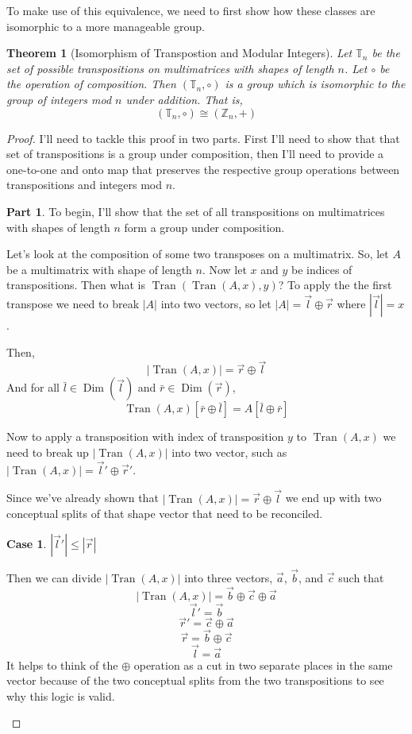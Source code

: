 \documentclass[12pt]{book}
\theoremstyle{plain}
\newtheorem{theorem}{Theorem}[chapter]
\theoremstyle{definition}
\theoremstyle{ppart}
\newtheorem{ppart}{Part}
\theoremstyle{case}
\newtheorem{case}{Case}
\theoremstyle{solution}
\DeclareMathOperator{\Dim}{Dim}
\DeclareMathOperator{\Tran}{Tran}
\newcommand{\shape}[1]{\left|#1\right|}
\begin{document}
To make use of this equivalence, we need to first show how these classes are
isomorphic \cite{book:abstract} to a more manageable group.

\begin{theorem}[Isomorphism of Transpostion and Modular Integers]
\label{tran_int_iso}
Let $\mathbb{T}_n$ be the set of possible transpositions on multimatrices with
shapes of length $n$. Let $\circ$ be the operation of composition. Then
$(\mathbb{T}_n, \circ)$ is a group which is isomorphic to the group of
integers mod $n$ under addition. That is,
\[ (\mathbb{T}_n, \circ) \cong (\mathbb{Z}_n, +) \]
\end{theorem}
\begin{proof}
I'll need to tackle this proof in two parts. First I'll need to show that
that set of transpositions is a group under composition, then I'll need to
provide a one-to-one and onto map that preserves the respective group operations
between transpositions and integers mod $n$.

\begin{ppart}
To begin, I'll show that the set of all transpositions on multimatrices 
with shapes of length $n$ form a group under composition.

Let's look at the composition of some two transposes on a multimatrix.
So, let $A$ be a multimatrix with shape of length $n$. Now let $x$ and $y$
be indices of transpositions. Then what is $\Tran(\Tran(A, x), y)$?
To apply the the first transpose we need to break $\shape{A}$ into two vectors,
so let $\shape{A} = \vec{l} \oplus \vec{r}$ where $\shape{\vec{l}} = x$.

Then,
\[ \shape{\Tran(A, x)} = \vec{r} \oplus \vec{l} \]
And for all
$\bar{l} \in \Dim(\vec{l})$ and $\bar{r} \in \Dim(\vec{r})$,
\[ \Tran(A, x)[\bar{r} \oplus \bar{l}] = A[\bar{l} \oplus \bar{r}] \]

Now to apply a transposition with index of transposition $y$ to $\Tran(A,x)$
we need to break up $\shape{\Tran(A,x)}$ into two vector, such as
$\shape{\Tran(A,x)} = \vec{l}' \oplus \vec{r}'$.

Since we've already shown that $\shape{\Tran(A,x)} = \vec{r} \oplus \vec{l}$
we end up with two conceptual splits of that shape vector that need to
be reconciled.

\begin{case} $\shape{\vec{l}'} \le \shape{\vec{r}}$

Then we can divide $\shape{\Tran(A,x)}$ into three vectors, $\vec{a}$, $\vec{b}$, and $\vec{c}$
such that
\[ \shape{\Tran(A,x)} = \vec{b} \oplus \vec{c} \oplus \vec{a} \]
\[ \vec{l}' = \vec{b} \]
\[ \vec{r}' = \vec{c} \oplus \vec{a} \]
\[ \vec{r} = \vec{b} \oplus \vec{c} \]
\[ \vec{l} = \vec{a} \]
It helps to think of the $\oplus$ operation as a cut in two separate places in the same
vector because of the two conceptual splits from the two transpositions to see why this
logic is valid.


\end{case}
\end{ppart}
\end{proof}
\end{document}
